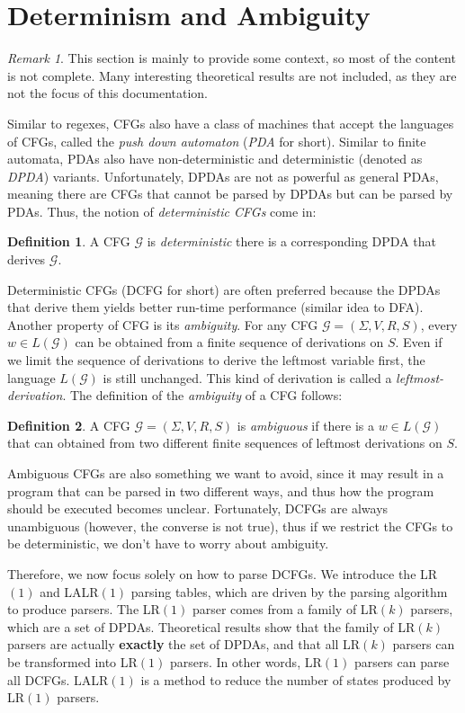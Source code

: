 \documentclass[titlepage]{article}
\theoremstyle{plain}
\theoremstyle{definition}
\newtheorem*{definition}{Definition}
\theoremstyle{remark}
\newtheorem*{remark}{Remark}
\begin{document}
\section{Determinism and Ambiguity}
\begin{remark}
  This section is mainly to provide some context, so most of the content is
  not complete. Many interesting
  theoretical results are not included, as they are not the focus of this
  documentation.
\end{remark}
Similar to regexes, CFGs also have a class of machines that accept the languages
of CFGs, called the \textit{push down automaton} (\textit{PDA} for short).
Similar to finite automata, PDAs also have non-deterministic and deterministic
(denoted as \textit{DPDA}) variants. Unfortunately, DPDAs are not as powerful as
general PDAs, meaning there are CFGs that cannot be parsed by DPDAs but can be
parsed by PDAs. Thus, the notion of \textit{deterministic CFGs} come in:
\begin{definition}
  A CFG $\mathcal{G}$ is \textit{deterministic} there is a corresponding DPDA
  that derives $\mathcal{G}$.
\end{definition}
Deterministic CFGs (DCFG for short) are often preferred because the DPDAs that
derive them yields better run-time performance (similar idea to DFA).
Another property of CFG is its \textit{ambiguity}. For any CFG $\mathcal{G}
=(\Sigma,V,R,S)$, every $w\in L(\mathcal{G})$ can be obtained from a finite
sequence of derivations on $S$. Even if we limit the sequence of derivations to
derive the leftmost variable first, the language $L(\mathcal{G})$ is still
unchanged. This kind of derivation is called a \textit{leftmost-derivation}. The
definition of the \textit{ambiguity} of a CFG follows:
\begin{definition}
  A CFG $\mathcal{G}=(\Sigma,V,R,S)$ is \textit{ambiguous} if there is a $w\in
  L(\mathcal{G})$ that can obtained from two different finite sequences of
  leftmost derivations on $S$.
\end{definition}
Ambiguous CFGs are also something we want to avoid, since it may result in a
program that can be parsed in two different ways, and thus how the program
should be executed becomes unclear. Fortunately, DCFGs are always
unambiguous (however, the converse is not true), thus if we restrict the CFGs
to be deterministic, we don't have to worry about ambiguity.

Therefore, we now focus solely on how to parse DCFGs. We introduce the LR$(1)$
and LALR$(1)$ parsing tables, which are driven by the parsing algorithm to produce
parsers. The LR$(1)$ parser comes from a family of LR$(k)$ parsers, which are
a set of DPDAs. Theoretical results show that the family of LR$(k)$ parsers
are actually \textbf{exactly} the set of DPDAs, and that all LR$(k)$ parsers
can be transformed into LR$(1)$ parsers. In other words, LR$(1)$ parsers can parse all
DCFGs. LALR$(1)$ is a method to reduce the number of states produced by LR$(1)$
parsers.
\end{document}
